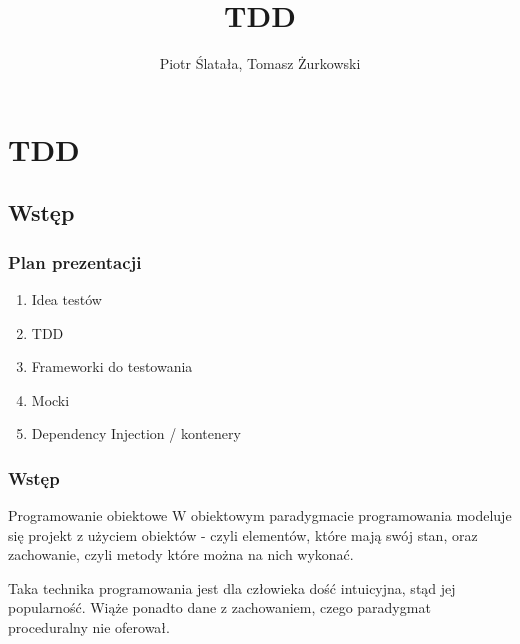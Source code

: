 \documentclass[slidestop,compress,mathserif]{beamer}
\title{TDD}
\author{Piotr Ślatała, Tomasz Żurkowski}
\begin{document}
\section{TDD}

\subsection{Wstęp}
\frame{
 \titlepage
}

\begin{frame}
 \frametitle{Plan prezentacji}
 \begin{enumerate}
 \item Idea testów
 \pause \item TDD
 \pause \item Frameworki do testowania
 \pause \item Mocki
 \pause \item Dependency Injection / kontenery
\end{enumerate}

\end{frame}


\begin{frame}
 \frametitle{Wstęp}

\begin{block}{Programowanie obiektowe}
 W obiektowym paradygmacie programowania modeluje się projekt z użyciem obiektów - czyli elementów, które mają swój stan, oraz zachowanie, czyli metody które można na nich wykonać.
\end{block}
\pause
\begin{block}{}
 Taka technika programowania jest dla człowieka dość intuicyjna, stąd jej popularność. Wiąże ponadto dane z zachowaniem, czego paradygmat proceduralny nie oferował.
\end{block}
\end{frame}
\end{document}

